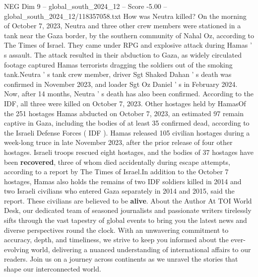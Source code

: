 \begin{textsample}{NEG Dim 9 – global\_south\_2024\_12 – Score -5.00 – global\_south\_2024\_12/118357058.txt}
How was Neutra killed?
On the morning of October 7, 2023, Neutra and three other crew members were stationed in a tank near the Gaza border, by the southern community of Nahal Oz, according to The Times of Israel.
They came under RPG and explosive attack during Hamas ' s assault.
The attack resulted in their abduction to Gaza, as widely circulated footage captured Hamas terrorists dragging the soldiers out of the smoking tank.Neutra ' s tank crew member, driver Sgt Shaked Dahan ' s death was confirmed in November 2023, and loader Sgt Oz Daniel ' s in February 2024.
Now, after 14 months, Neutra ' s death has also been confirmed.
According to the IDF, all three were killed on October 7, 2023.
Other hostages held by HamasOf the 251 hostages Hamas abducted on October 7, 2023, an estimated 97 remain captive in Gaza, including the bodies of at least 35 confirmed dead, according to the Israeli Defense Forces ( IDF ).
Hamas released 105 civilian hostages during a week-long truce in late November 2023, after the prior release of four other hostages.
Israeli troops rescued eight hostages, and the bodies of 37 hostages have been \textbf{recovered}, three of whom died accidentally during escape attempts, according to a report by The Times of Israel.In addition to the October 7 hostages, Hamas also holds the remains of two IDF soldiers killed in 2014 and two Israeli civilians who entered Gaza separately in 2014 and 2015, said the report.
These civilians are believed to be \textbf{alive}.
About the Author At TOI World Desk, our dedicated team of seasoned journalists and passionate writers tirelessly sifts through the vast tapestry of global events to bring you the latest news and diverse perspectives round the clock.
With an unwavering commitment to accuracy, depth, and timeliness, we strive to keep you informed about the ever-evolving world, delivering a nuanced understanding of international affairs to our readers.
Join us on a journey across continents as we unravel the stories that shape our interconnected world.

\end{textsample}
